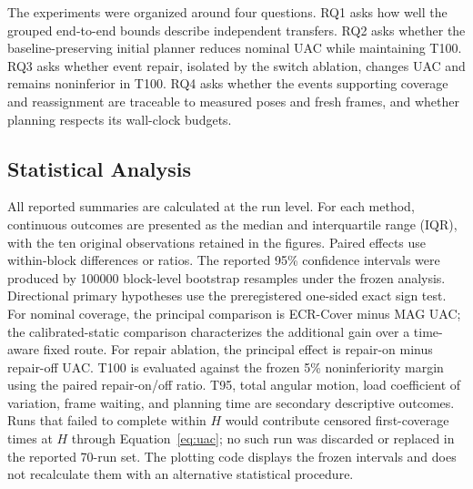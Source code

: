 The experiments were organized around four questions. RQ1 asks how well the grouped end-to-end bounds describe independent transfers. RQ2 asks whether the baseline-preserving initial planner reduces nominal UAC while maintaining T100. RQ3 asks whether event repair, isolated by the switch ablation, changes UAC and remains noninferior in T100. RQ4 asks whether the events supporting coverage and reassignment are traceable to measured poses and fresh frames, and whether planning respects its wall-clock budgets.

\subsection{Statistical Analysis}

All reported summaries are calculated at the run level. For each method, continuous outcomes are presented as the median and interquartile range (IQR), with the ten original observations retained in the figures. Paired effects use within-block differences or ratios. The reported 95\% confidence intervals were produced by 100000 block-level bootstrap resamples under the frozen analysis. Directional primary hypotheses use the preregistered one-sided exact sign test. For nominal coverage, the principal comparison is ECR-Cover minus MAG UAC; the calibrated-static comparison characterizes the additional gain over a time-aware fixed route. For repair ablation, the principal effect is repair-on minus repair-off UAC. T100 is evaluated against the frozen 5\% noninferiority margin using the paired repair-on/off ratio. T95, total angular motion, load coefficient of variation, frame waiting, and planning time are secondary descriptive outcomes. Runs that failed to complete within $H$ would contribute censored first-coverage times at $H$ through Equation~\eqref{eq:uac}; no such run was discarded or replaced in the reported 70-run set. The plotting code displays the frozen intervals and does not recalculate them with an alternative statistical procedure.

